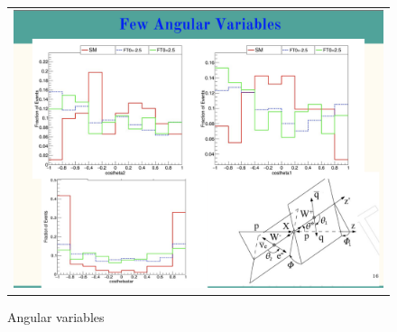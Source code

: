 \begin{figure}[htb]
  \begin{center}
    \begin{tabular}{c}
    \includegraphics[width=1.00\textwidth]{Plots/GenLevelStudy/pic7.png}
    \end{tabular}
    \caption{Angular variables}
    \label{fig:gen4}
  \end{center}
\end{figure}




